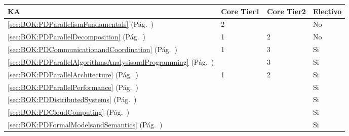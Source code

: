 \begin{center}
\begin{tabularx}{\textwidth}{|X|p{1cm}|p{1cm}|p{1.4cm}|}\hline
\textbf{\acf{KA}} & \textbf{Core Tier1} & \textbf{Core Tier2} & \textbf{Electivo} \\ \hline
\ref{sec:BOK:PDParallelismFundamentals} \htmlref{\PDParallelismFundamentals}{sec:BOK:PDParallelismFundamentals}\xspace (Pág.~\pageref{sec:BOK:PDParallelismFundamentals}) & 2 & ~ & No \\ \hline
\ref{sec:BOK:PDParallelDecomposition} \htmlref{\PDParallelDecomposition}{sec:BOK:PDParallelDecomposition}\xspace (Pág.~\pageref{sec:BOK:PDParallelDecomposition}) & 1 & 2 & No \\ \hline
\ref{sec:BOK:PDCommunicationandCoordination} \htmlref{\PDCommunicationandCoordination}{sec:BOK:PDCommunicationandCoordination}\xspace (Pág.~\pageref{sec:BOK:PDCommunicationandCoordination}) & 1 & 3 & Si \\ \hline
\ref{sec:BOK:PDParallelAlgorithmsAnalysisandProgramming} \htmlref{\PDParallelAlgorithmsAnalysisandProgramming}{sec:BOK:PDParallelAlgorithmsAnalysisandProgramming}\xspace (Pág.~\pageref{sec:BOK:PDParallelAlgorithmsAnalysisandProgramming}) & ~ & 3 & Si \\ \hline
\ref{sec:BOK:PDParallelArchitecture} \htmlref{\PDParallelArchitecture}{sec:BOK:PDParallelArchitecture}\xspace (Pág.~\pageref{sec:BOK:PDParallelArchitecture}) & 1 & 2 & Si \\ \hline
\ref{sec:BOK:PDParallelPerformance} \htmlref{\PDParallelPerformance}{sec:BOK:PDParallelPerformance}\xspace (Pág.~\pageref{sec:BOK:PDParallelPerformance}) & ~ & ~ & Si \\ \hline
\ref{sec:BOK:PDDistributedSystems} \htmlref{\PDDistributedSystems}{sec:BOK:PDDistributedSystems}\xspace (Pág.~\pageref{sec:BOK:PDDistributedSystems}) & ~ & ~ & Si \\ \hline
\ref{sec:BOK:PDCloudComputing} \htmlref{\PDCloudComputing}{sec:BOK:PDCloudComputing}\xspace (Pág.~\pageref{sec:BOK:PDCloudComputing}) & ~ & ~ & Si \\ \hline
\ref{sec:BOK:PDFormalModelsandSemantics} \htmlref{\PDFormalModelsandSemantics}{sec:BOK:PDFormalModelsandSemantics}\xspace (Pág.~\pageref{sec:BOK:PDFormalModelsandSemantics}) & ~ & ~ & Si \\ \hline
\end{tabularx}
\end{center}
